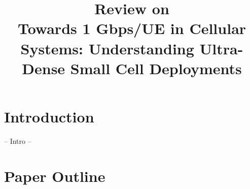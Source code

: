 \documentclass[12pt,conference,onecolumn]{IEEEtran}
\begin{document}
\title{Review on \\ Towards 1 Gbps/UE in Cellular Systems: Understanding Ultra-Dense Small Cell Deployments}
\author{
}

\maketitle

\IEEEpeerreviewmaketitle



\section{Introduction}
\label{sec:intro}

-- Intro --

\section{Paper Outline}
\label{sec:PO}
\end{document}
